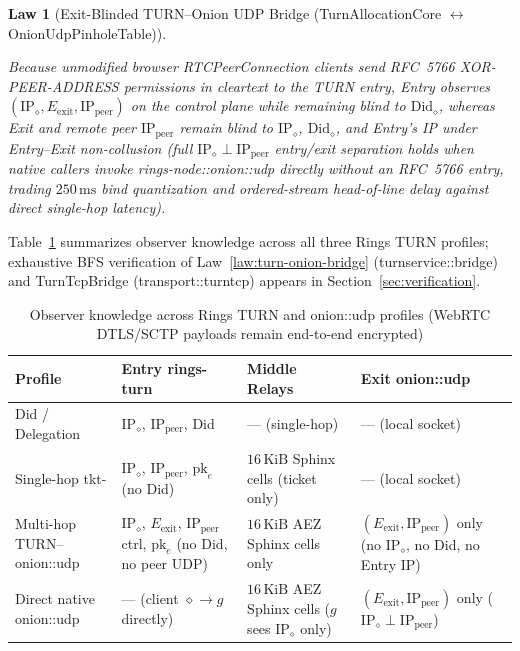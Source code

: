 \documentclass[journal]{IEEEtran}
\newtheorem{law}{Law}
\DeclareRobustCommand{\code}[1]{{\ttfamily\renewcommand{\_}{\textunderscore\allowbreak}#1}}
\begin{document}
\begin{law}[Exit-Blinded TURN--Onion UDP Bridge (\code{Turn\allowbreak Allocation\allowbreak Core} $\leftrightarrow$ \code{Onion\allowbreak Udp\allowbreak Pinhole\allowbreak Table})]
\begin{enumerate}[leftmargin=1.5em]
\end{enumerate}
Because unmodified browser \code{RTCPeerConnection} clients send RFC~5766 \code{XOR-PEER-ADDRESS} permissions in cleartext to the TURN entry, Entry observes $(\mathrm{IP}_\diamond,E_{\mathrm{exit}},\mathrm{IP}_{\mathrm{peer}})$ on the control plane while remaining blind to $\mathrm{Did}_\diamond$, whereas Exit and remote peer $\mathrm{IP}_{\mathrm{peer}}$ remain blind to $\mathrm{IP}_\diamond$, $\mathrm{Did}_\diamond$, and Entry's IP under Entry--Exit non-collusion (full $\mathrm{IP}_\diamond\perp\mathrm{IP}_{\mathrm{peer}}$ entry/exit separation holds when native callers invoke \code{rings-node::onion::udp} directly without an RFC~5766 entry, trading $250\,\mathrm{ms}$ bind quantization and ordered-stream head-of-line delay against direct single-hop latency).
\end{law}

Table~\ref{tab:turn-privacy} summarizes observer knowledge across all three Rings TURN profiles; exhaustive BFS verification of Law~\ref{law:turn-onion-bridge} (\code{turn\_service::bridge}) and \code{TurnTcpBridge} (\code{transport::turn\_tcp}) appears in Section~\ref{sec:verification}.

\begin{table}[htbp]
\centering
\caption{Observer knowledge across Rings TURN and \code{onion::udp} profiles (WebRTC DTLS/SCTP payloads remain end-to-end encrypted)}
\label{tab:turn-privacy}
\scriptsize
\setlength{\tabcolsep}{2.8pt}
\begin{tabular}{@{}p{1.85cm}>{\raggedright\arraybackslash}p{2.15cm}>{\raggedright\arraybackslash}p{1.85cm}>{\raggedright\arraybackslash}p{1.95cm}@{}}
\toprule
Profile & Entry \code{rings-turn} & Middle Relays & Exit \code{onion::udp} \\ \midrule
\code{Did} / \code{Delegation} & $\mathrm{IP}_\diamond$, $\mathrm{IP}_{\mathrm{peer}}$, \code{Did} & --- (single-hop) & --- (local socket) \\
Single-hop \code{tkt-} & $\mathrm{IP}_\diamond$, $\mathrm{IP}_{\mathrm{peer}}$, $\mathrm{pk}_e$ (no \code{Did}) & $16\,\mathrm{KiB}$ Sphinx cells (ticket only) & --- (local socket) \\
Multi-hop TURN--\code{onion::udp} & $\mathrm{IP}_\diamond$, $E_{\mathrm{exit}}$, $\mathrm{IP}_{\mathrm{peer}}$ ctrl, $\mathrm{pk}_e$ (no \code{Did}, no peer UDP) & $16\,\mathrm{KiB}$ AEZ Sphinx cells only & $(E_{\mathrm{exit}},\mathrm{IP}_{\mathrm{peer}})$ only (no $\mathrm{IP}_\diamond$, no \code{Did}, no Entry IP) \\
Direct native \code{onion::udp} & --- (client $\diamond\to g$ directly) & $16\,\mathrm{KiB}$ AEZ Sphinx cells ($g$ sees $\mathrm{IP}_\diamond$ only) & $(E_{\mathrm{exit}},\mathrm{IP}_{\mathrm{peer}})$ only ($\mathrm{IP}_\diamond\perp\mathrm{IP}_{\mathrm{peer}}$) \\
\bottomrule
\end{tabular}
\end{table}
\end{document}

